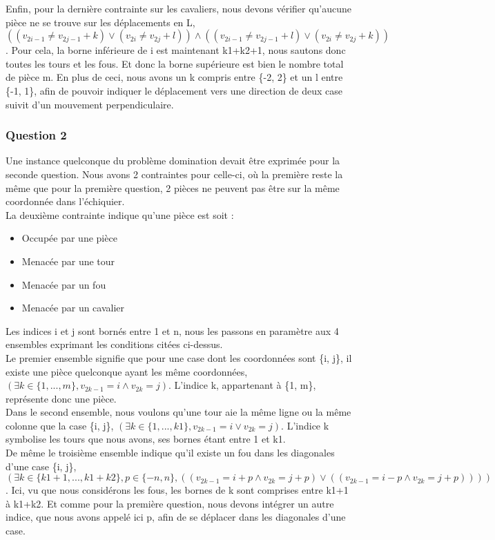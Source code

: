 \documentclass{article}
\begin{document}
Enfin, pour la dernière contrainte sur les cavaliers, nous devons vérifier qu'aucune pièce ne se trouve sur les déplacements en L, $((v_{2i-1} \neq v_{2j-1}+k) \vee  (v_{2i} \neq v_{2j}+l)) \wedge ((v_{2i-1} \neq v_{2j-1}+l) \vee  (v_{2i} \neq v_{2j}+k))$. Pour cela, la borne inférieure de i est maintenant k1+k2+1, nous sautons donc toutes les tours et les fous. Et donc la borne supérieure est bien le nombre total de pièce m. 
En plus de ceci, nous avons un k compris entre \{-2, 2\} et un l entre \{-1, 1\}, afin de pouvoir indiquer le déplacement vers une direction de deux case suivit d'un mouvement perpendiculaire. 

\subsubsection{Question 2}
Une instance quelconque du problème domination devait être exprimée pour la seconde question. Nous avons 2 contraintes pour celle-ci, où la première reste la même que pour la première question, 2 pièces ne peuvent pas être sur la même coordonnée dans l'échiquier.\\

La deuxième contrainte indique qu'une pièce est soit :
\begin{itemize}
\item Occupée par une pièce
\item Menacée par une tour
\item Menacée par un fou
\item Menacée par un cavalier
\end{itemize}

Les indices i et j sont bornés entre 1 et n, nous les passons en paramètre aux 4 ensembles exprimant les conditions citées ci-dessus. \\

Le premier ensemble signifie que pour une case dont les coordonnées sont \{i, j\}, il existe une pièce quelconque ayant les même coordonnées,
$(\exists k \in \{1, ..., m\}, v_{2k-1} = i \wedge v_{2k} = j)$. 
L'indice k, appartenant à \{1, m\}, représente donc une pièce.\\

Dans le second ensemble, nous voulons qu'une tour aie la même ligne ou la même colonne que la case \{i, j\}, $(\exists k \in \{1, ..., k1\}, v_{2k-1} = i \vee v_{2k} = j)$. L'indice k symbolise les tours que nous avons, ses bornes étant entre 1 et k1.\\

De même le troisième ensemble indique qu'il existe un fou dans les diagonales d'une case \{i, j\}, $(\exists k \in \{k1+1, ..., k1+k2\}, p \in\{-n, n \}, ((v_{2k-1} = i+p \wedge v_{2k} = j+p) \vee ((v_{2k-1} = i-p \wedge v_{2k} = j+p))))$. Ici, vu que nous considérons les fous, les bornes de k sont comprises entre k1+1 à k1+k2. Et comme pour la première question, nous devons intégrer un autre indice, que nous avons appelé ici p, afin de se déplacer dans les diagonales d'une case. \\
\end{document}
